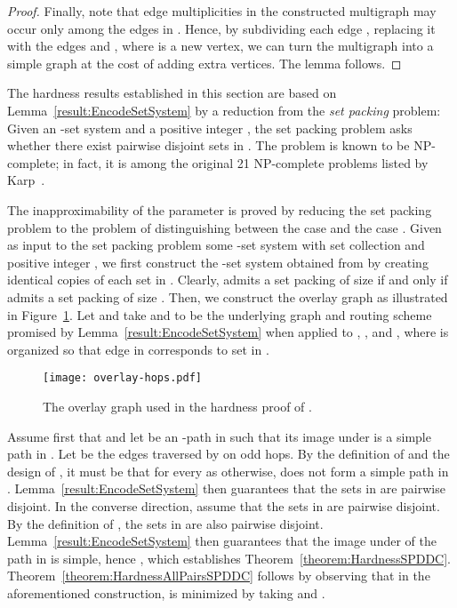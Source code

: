 \LongVersion \documentclass[11pt]{article}
\theoremstyle{definition}
\theoremstyle{plain}
\begin{document}
\begin{proof}
Finally, note that edge multiplicities in the constructed multigraph  
may occur only among the edges in .
Hence, by subdividing each edge , replacing it with the
edges  and , where  is a new vertex, we can turn the
multigraph  into a simple graph at the cost of adding  extra
vertices. The lemma follows.
\end{proof}

The hardness results established in this section are based on
Lemma~\ref{result:EncodeSetSystem} by a reduction from the \emph{set packing}
problem:
Given an -set system  and a positive integer , the
set packing problem asks whether there exist  pairwise disjoint sets in
.
The problem is known to be NP-complete;
in fact, it is among the original 21 NP-complete problems listed by
Karp~\cite{Karp72}.

The inapproximability of the  parameter is proved
by reducing the set packing problem to the problem of distinguishing between 
the case
 and the case .
Given as input to the set packing problem some -set system 
with set collection  and positive integer ,
we first construct the -set system  obtained
from  by creating  identical copies 
of each set  in .
Clearly,  admits a set packing of size  if and only if 
admits a set packing of size .
Then, we construct the overlay graph  as illustrated in
Figure~\ref{figure:OverlayHops}.
Let  and
take  and  to be the underlying graph and routing scheme promised by
Lemma~\ref{result:EncodeSetSystem} when applied to , , and
, where  is organized so that edge  in  corresponds to set  in .

\begin{figure}
\begin{center}
\texttt{[image: overlay-hops.pdf]}
\end{center}
\caption{\label{figure:OverlayHops}
The overlay graph  used in the hardness proof of .
}
\end{figure}

Assume first that  and let  be an -path in  such that its image under  is a simple path in .
Let  be the edges
traversed by  on odd hops.
By the definition of  and the design of , it must be that
 for every  as otherwise,
 does not form a simple path in .
Lemma~\ref{result:EncodeSetSystem} then guarantees that the sets  in  are pairwise disjoint.
In the converse direction, assume that the sets  in
 are pairwise disjoint.
By the definition of , the sets  in
 are also pairwise disjoint.
Lemma~\ref{result:EncodeSetSystem} then guarantees that the image under
 of the path  in  is simple, hence , which establishes Theorem~\ref{theorem:HardnessSPDDC}.
Theorem~\ref{theorem:HardnessAllPairsSPDDC} follows by observing that in the
aforementioned construction,  is minimized by
taking  and .
\end{document}
